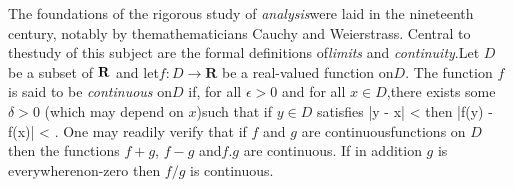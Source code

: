 \documentclass{article}
\begin{document}
The foundations of the rigorous study of \emph{analysis}were laid in the nineteenth century, notably by themathematicians Cauchy and Weierstrass. Central to thestudy of this subject are the formal definitions of\emph{limits} and \emph{continuity}.Let $D$ be a subset of $\bf R$ and let$f \colon D \to \mathbf{R}$ be a real-valued function on$D$. The function $f$ is said to be \emph{continuous} on$D$ if, for all $\epsilon > 0$ and for all $x \in D$,there exists some $\delta > 0$ (which may depend on $x$)such that if $y \in D$ satisfies |y - x| < \delta then |f(y) - f(x)| < \epsilon. One may readily verify that if $f$ and $g$ are continuousfunctions on $D$ then the functions $f+g$, $f-g$ and$f.g$ are continuous. If in addition $g$ is everywherenon-zero then $f/g$ is continuous.
\end{document}
